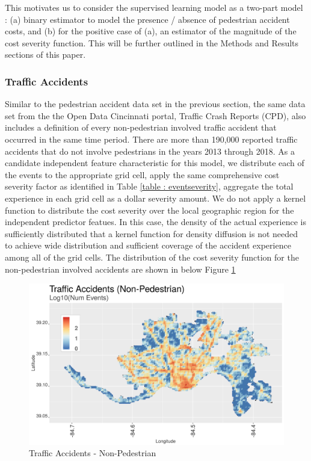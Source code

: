 \documentclass{llncs}
\begin{document}
This motivates us to consider the supervised learning model as a two-part model : (a) binary estimator to model the presence / absence of pedestrian accident costs, and (b) for the positive case of (a), an estimator of the magnitude of the cost severity function. This will be further outlined in the Methods and Results sections of this paper.


\subsubsection{Traffic Accidents}

Similar to the pedestrian accident data set in the previous section, the same data set from the the Open Data Cincinnati portal, Traffic Crash Reports (CPD), also includes a definition of every non-pedestrian involved traffic accident that occurred in the same time period.  There are more than 190,000 reported traffic accidents that do not involve pedestrians in the years 2013 through 2018. As a candidate independent feature characteristic for this model, we distribute each of the events to the appropriate grid cell, apply the same comprehensive cost severity factor as identified in Table \ref{table : eventseverity}, aggregate the total experience in each grid cell as a dollar severity amount. We do not apply a kernel function to distribute the cost severity over the local geographic region for the independent predictor featues. In this case, the density of the actual experience is sufficiently distributed that a kernel function for density diffusion is not needed to achieve wide distribution and sufficient coverage of the accident experience among all of the grid cells. The distribution of the cost severity function for the non-pedestrian involved accidents are shown in below Figure \ref{figure : trafficAccidentsNonPedestrian}

\FloatBarrier
\begin{figure}
 	\includegraphics[width=\textwidth, height=\textheight, keepaspectratio]{trafficAccidentsNonPedestrian}
 	\caption{Traffic Accidents - Non-Pedestrian}
	\label{figure : trafficAccidentsNonPedestrian}
\end{figure}
\FloatBarrier
\end{document}
